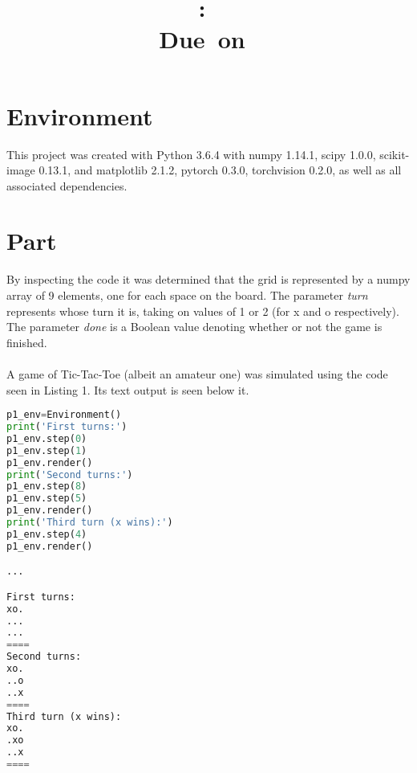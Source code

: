 \documentclass{article}
\title{
	\vspace{2in}
	\textmd{\textbf{\hmwkClass:\ \hmwkTitle}}\\
	\normalsize\vspace{0.1in}\small{Due\ on\ \hmwkDueDate}\\
	\vspace{0.1in}
	\vspace{3in}
}
\author{\textbf{\hmwkAuthorName}}
\newcommand{\enterproblemHeader}[1]{
}
\newcommand{\exitproblemHeader}[1]{
}
\newcounter{problem} %
\newcommand{\problemName}{}
\newenvironment{problem}[1][Part \theproblem]{ %
	\stepcounter{problem} %
	\renewcommand{\problemName}{#1} %
	\section{\problemName} %
	\enterproblemHeader{\problemName} %
}{
	\exitproblemHeader{\problemName} %
}
\begin{document}
\maketitle
\clearpage


\begin{problem}[Environment]	
	This project was created with Python 3.6.4 with numpy 1.14.1, scipy 1.0.0, scikit-image 0.13.1, and matplotlib 2.1.2, pytorch 0.3.0, torchvision 0.2.0, as well as all associated dependencies.
\end{problem}
\clearpage

\FloatBarrier
\begin{problem}
By inspecting the code it was determined that the grid is represented by a numpy array of 9 elements, one for each space on the board. The parameter \textit{turn} represents whose turn it is, taking on values of 1 or 2 (for x and o respectively). The parameter \textit{done} is a Boolean value denoting whether or not the game is finished.\\\\
A game of Tic-Tac-Toe (albeit an amateur one) was simulated using the code seen in Listing 1. Its text output is seen below it.
\begin{lstlisting}[language=Python, caption=Simulated game of Tic-Tac-Toe]
p1_env=Environment()
print('First turns:')
p1_env.step(0)
p1_env.step(1)
p1_env.render()
print('Second turns:')
p1_env.step(8)
p1_env.step(5)
p1_env.render()
print('Third turn (x wins):')
p1_env.step(4)
p1_env.render()

...

First turns:
xo.
...
...
====
Second turns:
xo.
..o
..x
====
Third turn (x wins):
xo.
.xo
..x
====
\end{lstlisting}
	
	
\end{problem}
\clearpage
\end{document}
